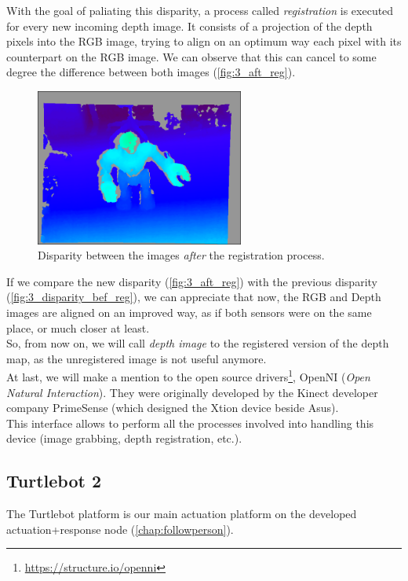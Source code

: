 		With the goal of paliating this disparity, a process called \emph{registration} is executed for every new incoming depth image. It consists of a projection of the depth pixels into the RGB image, trying to align on an optimum way each pixel with its counterpart on the RGB image. We can observe that this can cancel to some degree the difference between both images (\autoref{fig:3_aft_reg}).
		
		
		\begin{figure}[h!]
			\centering
			\includegraphics[width=2.7in]{images/disparity_after}
			\caption{Disparity between the images \emph{after} the registration process.}
			\label{fig:3_aft_reg}
		\end{figure}
		
		If we compare the new disparity (\autoref{fig:3_aft_reg}) with the previous disparity (\autoref{fig:3_disparity_bef_reg}), we can appreciate that now, the RGB and Depth images are aligned on an improved way, as if both sensors were on the same place, or much closer at least.\\
		
		So, from now on, we will call \emph{depth image} to the registered version of the depth map, as the unregistered image is not useful anymore.\\
		
		At last, we will make a mention to the open source drivers\footnote{\url{https://structure.io/openni}}, OpenNI (\emph{Open Natural Interaction}). They were originally developed by the Kinect developer company PrimeSense (which designed the Xtion device beside Asus).\\
		
		This interface allows to perform all the processes involved into handling this device (image grabbing, depth registration, etc.).
	
	\vspace{3in}
	\subsection{Turtlebot 2}
		The Turtlebot platform is our main actuation platform on the developed actuation+response node (\autoref{chap:followperson}).\\
		
